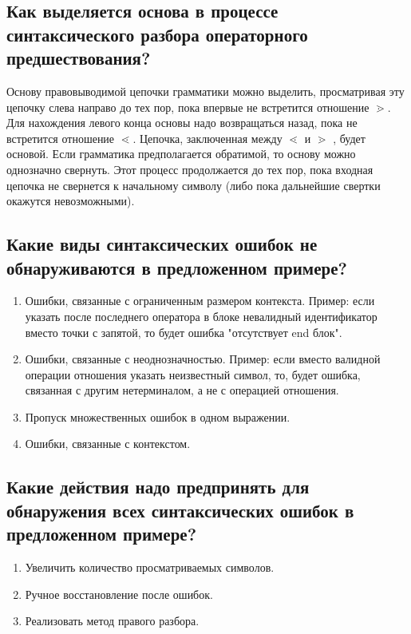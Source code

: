 \subsection{Как выделяется основа в процессе синтаксического разбора операторного предшествования?}

Основу правовыводимой цепочки грамматики можно выделить, просматривая эту цепочку слева направо до тех пор, пока впервые не встретится отношение $\gtrdot$. Для нахождения левого конца основы надо возвращаться назад, пока не встретится отношение $\lessdot$. Цепочка, заключенная между $\lessdot$ и $\gtrdot$ , будет основой. Если грамматика предполагается обратимой, то основу можно однозначно свернуть. Этот процесс продолжается до тех пор, пока входная цепочка не свернется к начальному символу (либо пока дальнейшие свертки окажутся невозможными).

\subsection{Какие виды синтаксических ошибок не обнаруживаются в предложенном примере?}

\begin{enumerate}
	\item Ошибки, связанные с ограниченным размером контекста. Пример: если указать после последнего оператора в блоке невалидный идентификатор вместо точки с запятой, то будет ошибка "отсутствует end блок".
	\item Ошибки, связанные с неоднозначностью. Пример: если вместо валидной операции отношения указать неизвестный символ, то, будет ошибка, связанная с другим нетерминалом, а не с операцией отношения.
	\item Пропуск множественных ошибок в одном выражении.
	\item Ошибки, связанные с контекстом.
\end{enumerate}

\subsection{Какие действия надо предпринять для обнаружения всех синтаксических ошибок в предложенном примере?}

\begin{enumerate}
	\item Увеличить количество просматриваемых символов.
	\item Ручное восстановление после ошибок.
	\item Реализовать метод правого разбора.
\end{enumerate}


